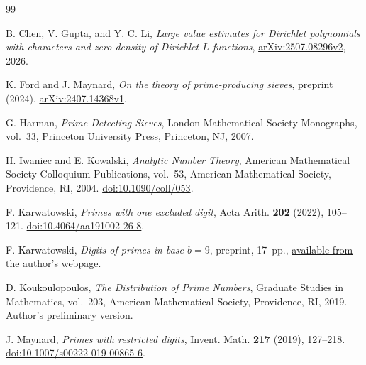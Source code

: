 \documentclass[11pt,a4paper]{article}
\theoremstyle{paperplain}
\numberwithin{equation}{section}
\begin{document}
\clearpage
{}
{}
\begin{thebibliography}{99}
\raggedright

B. Chen, V. Gupta, and Y. C. Li,
\emph{Large value estimates for Dirichlet polynomials with characters and
zero density of Dirichlet $L$-functions},
\href{https://arxiv.org/abs/2507.08296v2}{arXiv:2507.08296v2}, 2026.

K. Ford and J. Maynard,
\textit{On the theory of prime-producing sieves},
preprint (2024),
\href{https://arxiv.org/abs/2407.14368v1}{arXiv:2407.14368v1}.

G. Harman,
\textit{Prime-Detecting Sieves},
London Mathematical Society Monographs, vol.~33,
Princeton University Press, Princeton, NJ, 2007.

H. Iwaniec and E. Kowalski,
\textit{Analytic Number Theory},
American Mathematical Society Colloquium Publications, vol.~53,
American Mathematical Society, Providence, RI, 2004.
\href{https://doi.org/10.1090/coll/053}{doi:10.1090/coll/053}.

F. Karwatowski,
\textit{Primes with one excluded digit},
Acta Arith. \textbf{202} (2022), 105--121.
\href{https://doi.org/10.4064/aa191002-26-8}{doi:10.4064/aa191002-26-8}.

F. Karwatowski,
\textit{Digits of primes in base $b=9$},
preprint, 17~pp.,
\href{https://www.math.hhu.de/fileadmin/redaktion/Fakultaeten/Mathematisch-Naturwissenschaftliche_Fakultaet/Mathematik/20_Institut-Lehrstuehle/5_Algebra_und_Zahlentheorie/Karwatowski/Digits_of_primes_in_base_b_9.pdf}{available from the author's webpage}.

D. Koukoulopoulos,
\textit{The Distribution of Prime Numbers},
Graduate Studies in Mathematics, vol.~203,
American Mathematical Society, Providence, RI, 2019.
\href{https://dms.umontreal.ca/~koukoulo/documents/publications/primes.pdf}{Author's preliminary version}.

J. Maynard,
\textit{Primes with restricted digits},
Invent. Math. \textbf{217} (2019), 127--218.
\href{https://doi.org/10.1007/s00222-019-00865-6}{doi:10.1007/s00222-019-00865-6}.

\end{thebibliography}
\end{document}
